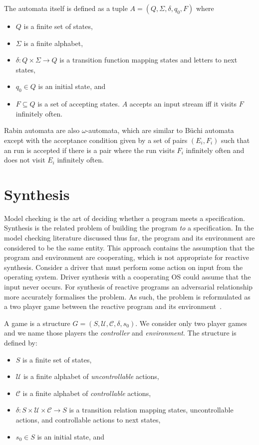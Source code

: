 The automata itself is defined as a tuple $A = (Q, \Sigma, \delta, q_0, F)$ where

\begin{itemize} 
    \item $Q$ is a finite set of states,
    \item $\Sigma$ is a finite alphabet,
    \item $\delta : Q \times \Sigma \to Q$ is a transition function mapping states and letters to next states,
    \item $q_0 \in Q$ is an initial state, and
    \item $F \subseteq Q$ is a set of accepting states. $A$ accepts an input stream iff it visits $F$ infinitely often.
\end{itemize}

Rabin automata are also $\omega$-automata, which are similar to B\"uchi automata except with the acceptance condition given by a set of pairs $(E_i, F_i)$ such that an run is accepted if there is a pair where the run visits $F_i$ infinitely often and does not visit $E_i$ infinitely often.

\section{Synthesis}

Model checking is the art of deciding whether a program meets a specification. Synthesis is the related problem of building the program \emph{to} a specification. In the model checking literature discussed thus far, the program and its environment are considered to be the same entity. This approach contains the assumption that the program and environment are cooperating, which is not appropriate for reactive synthesis. Consider a driver that must perform some action on input from the operating system. Driver synthesis with a cooperating OS could assume that the input never occurs. For synthesis of reactive programs an adversarial relationship more accurately formalises the problem. As such, the problem is reformulated as a two player game between the reactive program and its environment~\cite{Pnueli89}.

A game is a structure $G = (S, \mathcal{U}, \mathcal{C}, \delta, s_0)$. We consider only two player games and we name those players the \emph{controller} and \emph{environment}. The structure is defined by:

\begin{itemize}
    \item $S$ is a finite set of states,
    \item $\mathcal{U}$ is a finite alphabet of \emph{uncontrollable} actions,
    \item $\mathcal{C}$ is a finite alphabet of \emph{controllable} actions,
    \item $\delta : S \times \mathcal{U} \times \mathcal{C} \to S$ is a transition relation mapping states, uncontrollable actions, and controllable actions to next states,
    \item $s_0 \in S$ is an initial state, and
\end{itemize}

